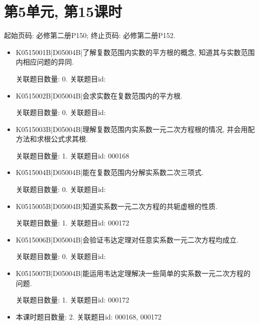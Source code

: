 \section*{第5单元, 第15课时}
起始页码: 必修第二册P150; 终止页码: 必修第二册P152.
\begin{itemize}
\item K0515001B|D05004B|了解复数范围内实数的平方根的概念, 知道其与实数范围内相应问题的异同.

关联题目数量: 0. 关联题目id: 

\item K0515002B|D05004B|会求实数在复数范围内的平方根.

关联题目数量: 0. 关联题目id: 

\item K0515003B|D05004B|理解复数范围内实系数一元二次方程根的情况, 并会用配方法和求根公式求其根.

关联题目数量: 1. 关联题目id: 000168

\item K0515004B|D05004B|能在复数范围内分解实系数二次三项式.

关联题目数量: 0. 关联题目id: 

\item K0515005B|D05004B|知道实系数一元二次方程的共轭虚根的性质.

关联题目数量: 1. 关联题目id: 000172

\item K0515006B|D05004B|会验证韦达定理对任意实系数一元二次方程均成立.

关联题目数量: 0. 关联题目id: 

\item K0515007B|D05004B|能运用韦达定理解决一些简单的实系数一元二次方程的问题.

关联题目数量: 1. 关联题目id: 000172

\item 本课时题目数量: 2. 关联题目id: 000168, 000172

\end{itemize}

